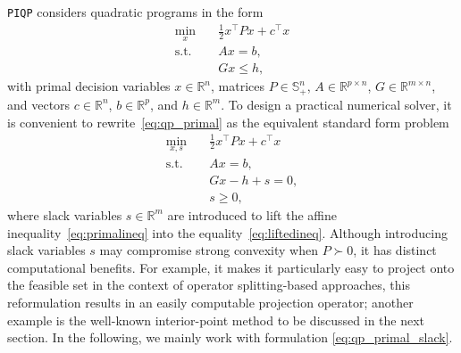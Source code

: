 \documentclass[letterpaper, 10 pt, conference]{ieeeconf}  \IEEEoverridecommandlockouts
\begin{document}
\texttt{PIQP} considers quadratic programs in the form
\begin{subequations} 
\label{eq:qp_primal}
\begin{align}\label{eq:primalobj}
\min_{x} \quad & \frac{1}{2} x^\top P x + c^\top x \\\label{eq:primaleq}
\text {s.t.}\quad & Ax=b, \\\label{eq:primalineq}
& Gx \leq h,
\end{align}
\end{subequations}
with primal decision variables $x \in \mathbb{R}^n$, matrices $P\in \mathbb{S}_+^n$, $A \in \mathbb{R}^{p \times n}$,  $G \in \mathbb{R}^{m \times n}$, and vectors $c \in \mathbb{R}^n$, $b \in \mathbb{R}^p$, and $h \in \mathbb{R}^m$.
To design a practical numerical solver, it is convenient to rewrite~\eqref{eq:qp_primal} as the equivalent standard form problem
\begin{subequations} 
\label{eq:qp_primal_slack}
\begin{align}
\min_{x,s} \quad & \frac{1}{2} x^\top P x + c^\top x \\\label{eq:liftedeq}
\text{s.t.}\quad & Ax=b, \\\label{eq:liftedineq}
& Gx - h + s = 0, \\\label{eq:liftedslack}
& s \geq 0,
\end{align}
\end{subequations}
where slack variables $s \in \mathbb{R}^m$ are introduced to lift the affine inequality~\eqref{eq:primalineq} into the equality~\eqref{eq:liftedineq}. Although introducing slack variables $s$ may compromise strong convexity when $P\succ 0$, it has distinct computational benefits. For example, it makes it particularly easy to project onto the feasible set in the context of operator splitting-based approaches, this reformulation results in an easily computable projection operator; another example is the well-known interior-point method to be discussed in the next section. In the following, we mainly work with formulation \eqref{eq:qp_primal_slack}.
\end{document}
